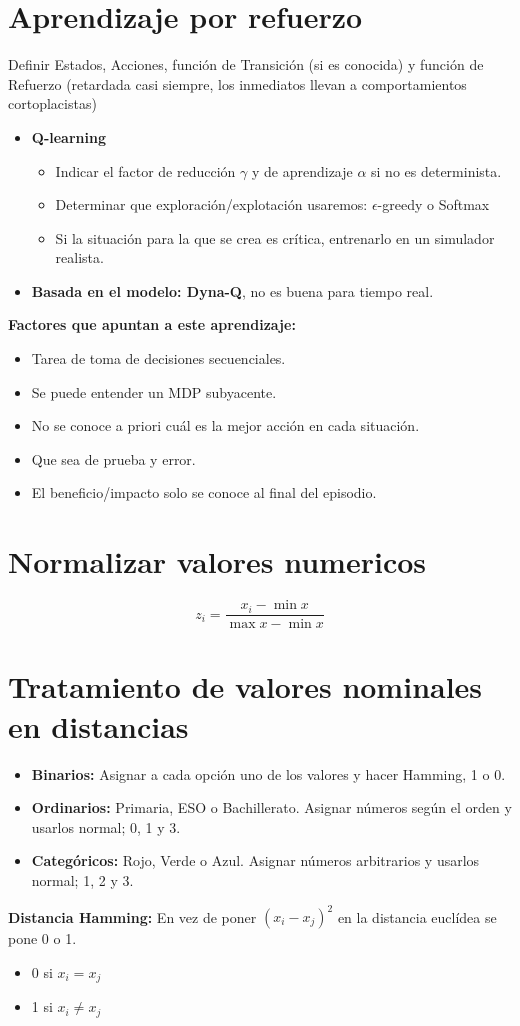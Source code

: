 \documentclass[12pt, twoside, openright]{report} %
\begin{document}
\section{Aprendizaje por refuerzo}
Definir Estados, Acciones, función de Transición (si es conocida) y función de Refuerzo (retardada casi siempre, los inmediatos llevan a comportamientos cortoplacistas)

\begin{itemize}
  \item \textbf{Q-learning}
  \begin{itemize}
    \item Indicar el factor de reducción $\gamma$ y de aprendizaje $\alpha$ si no es determinista.
    \item Determinar que exploración/explotación usaremos: $\epsilon$-greedy o Softmax
    \item Si la situación para la que se crea es crítica, entrenarlo en un simulador realista.
  \end{itemize}
  \item \textbf{Basada en el modelo: Dyna-Q}, no es buena para tiempo real.
\end{itemize}

\textbf{Factores que apuntan a este aprendizaje:}
\begin{itemize}
  \item Tarea de toma de decisiones secuenciales.
  \item Se puede entender un MDP subyacente.
  \item No se conoce a priori cuál es la mejor acción en cada situación.
  \item Que sea de prueba y error.
  \item El beneficio/impacto solo se conoce al final del episodio.
\end{itemize}

\section{Normalizar valores numericos}
$$z_i = \frac{x_i - \min x}{\max x - \min x}$$

\section{Tratamiento de valores nominales en distancias}
\begin{itemize}
  \item \textbf{Binarios:} Asignar a cada opción uno de los valores y hacer Hamming, 1 o 0.
  \item \textbf{Ordinarios:} Primaria, ESO o Bachillerato. Asignar números según el orden y usarlos normal; 0, 1 y 3.
  \item \textbf{Categóricos:} Rojo, Verde o Azul. Asignar números arbitrarios y usarlos normal; 1, 2 y 3.
\end{itemize}
\textbf{Distancia Hamming:} En vez de poner $(x_i - x_j)^2$ en la distancia euclídea se pone 0 o 1.
\begin{itemize}
  \item 0 si $x_i = x_j$
  \item 1 si $x_i \neq x_j$
\end{itemize}
\end{document}
